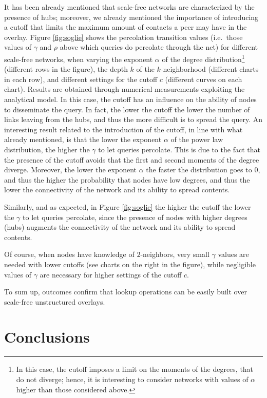 \documentclass{sig-alternate}
\begin{document}
It has been already mentioned that scale-free networks are characterized by the presence of hubs; moreover, we already mentioned the importance of introducing a cutoff that limits the maximum amount of contacts a peer may have in the overlay. Figure \ref{fig:soglie} shows the percolation transition values (i.e.~those values of $\gamma$ and $\rho$ above which queries do percolate through the net) for different scale-free networks, when varying the exponent $\alpha$ of the degree distribution\footnote{In this case, the cutoff imposes a limit on the moments of the degrees, that do not diverge; hence, it is interesting to consider networks with values of $\alpha$ higher than those considered above.} (different rows in the figure), the depth $k$ of the $k$-neighborhood (different charts in each row), and different settings for the cutoff $c$ (different curves on each chart).
Results are obtained through numerical measurements exploiting the analytical model. 
In this case, the cutoff has an influence on the ability of nodes to disseminate the query. In fact, the lower the cutoff the lower the number of links leaving from the hubs, and thus the more difficult is to spread the query. 
An interesting result related to the introduction of the cutoff, in line with what already mentioned, is that the lower the exponent $\alpha$ of the power law distribution, the higher the $\gamma$ to let queries percolate. 
This is due to the fact that the presence of the cutoff avoids that the first and second moments of the degree diverge. Moreover, the lower the exponent $\alpha$ the faster the distribution goes to $0$, and thus the higher the probability that nodes have low degrees, and thus the lower the connectivity of the network and its ability to spread contents.

Similarly, and as expected, in Figure \ref{fig:soglie} the higher the cutoff the lower the $\gamma$ to let queries percolate, since the presence of nodes with higher degrees (hubs) augments the connectivity of the network and its ability to spread contents.

Of course, when nodes have knowledge of $2$-neighbors, very small $\gamma$ values are needed with lower cutoffs (see charts on the right in the figure), while negligible values of $\gamma$ are necessary for higher settings of the cutoff $c$.

To sum up, outcomes confirm that lookup operations can be easily built over scale-free unstructured overlays.



\section{Conclusions}\label{sec:conc}
\end{document}
